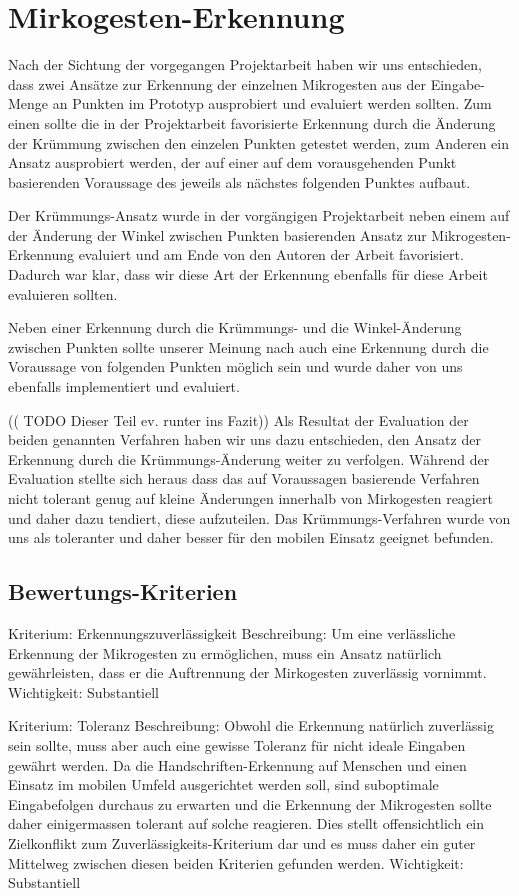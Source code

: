 \chapter{Mirkogesten-Erkennung}

Nach der Sichtung der vorgegangen Projektarbeit haben wir uns entschieden, dass zwei Ansätze zur Erkennung der einzelnen Mikrogesten aus der Eingabe-Menge an Punkten im Prototyp ausprobiert und evaluiert werden sollten. Zum einen sollte die in der Projektarbeit favorisierte Erkennung durch die Änderung der Krümmung zwischen den einzelen Punkten getestet werden, zum Anderen ein Ansatz ausprobiert werden, der auf einer auf dem vorausgehenden Punkt basierenden Voraussage des jeweils als nächstes folgenden Punktes aufbaut.

Der Krümmungs-Ansatz wurde in der vorgängigen Projektarbeit neben einem auf der Änderung der Winkel zwischen Punkten basierenden Ansatz zur Mikrogesten-Erkennung evaluiert und am Ende von den Autoren der Arbeit favorisiert. Dadurch war klar, dass wir diese Art der Erkennung ebenfalls für diese Arbeit evaluieren sollten.

Neben einer Erkennung durch die Krümmungs- und die Winkel-Änderung zwischen Punkten sollte unserer Meinung nach auch eine Erkennung durch die Voraussage von folgenden Punkten möglich sein und wurde daher von uns ebenfalls implementiert und evaluiert.

(( TODO Dieser Teil ev. runter ins Fazit))
Als Resultat der Evaluation der beiden genannten Verfahren haben wir uns dazu entschieden, den Ansatz der Erkennung durch die Krümmungs-Änderung weiter zu verfolgen. Während der Evaluation stellte sich heraus dass das auf Voraussagen basierende Verfahren nicht tolerant genug auf kleine Änderungen innerhalb von Mirkogesten reagiert und daher dazu tendiert, diese aufzuteilen. Das Krümmungs-Verfahren wurde von uns als toleranter und daher besser für den mobilen Einsatz geeignet befunden.

\section{Bewertungs-Kriterien}

Kriterium:	Erkennungszuverlässigkeit
Beschreibung:	Um eine verlässliche Erkennung der Mikrogesten zu ermöglichen, muss ein Ansatz natürlich gewährleisten, dass er die Auftrennung der Mirkogesten zuverlässig vornimmt.
Wichtigkeit:	Substantiell

Kriterium:	Toleranz
Beschreibung:	Obwohl die Erkennung natürlich zuverlässig sein sollte, muss aber auch eine gewisse Toleranz für nicht ideale Eingaben gewährt werden. Da die Handschriften-Erkennung auf Menschen und einen Einsatz im mobilen Umfeld ausgerichtet werden soll, sind suboptimale Eingabefolgen durchaus zu erwarten und die Erkennung der Mikrogesten sollte daher einigermassen tolerant auf solche reagieren. Dies stellt offensichtlich ein Zielkonflikt zum Zuverlässigkeits-Kriterium dar und es muss daher ein guter Mittelweg zwischen diesen beiden Kriterien gefunden werden.
Wichtigkeit:	Substantiell

